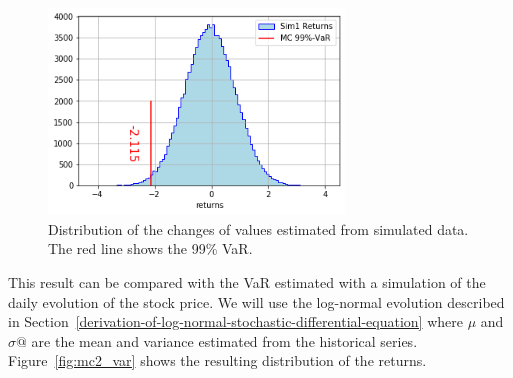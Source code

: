 \begin{figure}[htb]
	\centering
	\includegraphics[width=0.7\textwidth]{figures/Untitled_2_1.png}
	\caption{Distribution of the changes of values estimated from simulated data. The red line shows the 99\% VaR.}
	\label{fig:mc1_var}
\end{figure}

This result can be compared with the VaR estimated with a simulation of the daily evolution of the stock price. We will use the log-normal evolution described in Section~\ref{derivation-of-log-normal-stochastic-differential-equation} where $\mu$ and $\sigma@$ are the mean and variance estimated from the historical series. Figure~\ref{fig:mc2_var} shows the resulting distribution of the returns.

